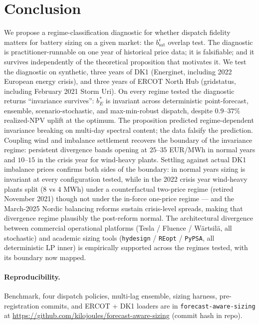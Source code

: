\documentclass[11pt]{article}
\begin{document}
\section{Conclusion}

We propose a regime-classification diagnostic for whether dispatch fidelity matters for battery sizing on a given market: the $b_{\mathrm{sat}}^\epsilon$ overlap test. The diagnostic is practitioner-runnable on one year of historical price data; it is falsifiable; and it survives independently of the theoretical proposition that motivates it. We test the diagnostic on synthetic, three years of DK1 (Energinet, including 2022 European energy crisis), and three years of ERCOT North Hub (gridstatus, including February 2021 Storm Uri). On every regime tested the diagnostic returns ``invariance survives'': $b_E^*$ is invariant across deterministic point-forecast, ensemble, scenario-stochastic, and max-min-robust dispatch, despite $0.9$--$37\%$ realized-NPV uplift at the optimum. The proposition predicted regime-dependent invariance breaking on multi-day spectral content; the data falsify the prediction. Coupling wind and imbalance settlement recovers the boundary of the invariance regime: persistent divergence bands opening at $25$--$35$ EUR/MWh in normal years and $10$--$15$ in the crisis year for wind-heavy plants. Settling against actual DK1 imbalance prices confirms both sides of the boundary: in normal years sizing is invariant at every configuration tested, while in the 2022 crisis year wind-heavy plants split ($8$ vs $4$ MWh) under a counterfactual two-price regime (retired November 2021) though not under the in-force one-price regime --- and the March-2025 Nordic balancing reforms sustain crisis-level spreads, making that divergence regime plausibly the post-reform normal. The architectural divergence between commercial operational platforms (Tesla / Fluence / W\"{a}rtsil\"{a}, all stochastic) and academic sizing tools (\texttt{hydesign} / \texttt{REopt} / \texttt{PyPSA}, all deterministic LP inner) is empirically supported across the regimes tested, with its boundary now mapped.

\paragraph{Reproducibility.}
Benchmark, four dispatch policies, multi-lag ensemble, sizing harness, pre-registration commits, and ERCOT + DK1 loaders are in \texttt{forecast-aware-sizing} at \url{https://github.com/kilojoules/forecast-aware-sizing} (commit hash in repo).
\end{document}
